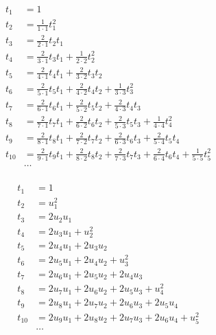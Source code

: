 \begin{equation*}
\begin{aligned}
t_1 &= 1 \\
t_2 &= \frac{1}{1 \cdot 1} t_1^2 \\
t_3 &= \frac{2}{2 \cdot 1} t_2 t_1 \\
t_4 &= 
  \frac{2}{3 \cdot 1} t_3 t_1 
+ \frac{1}{2 \cdot 2} t_2^2 
\\
t_5 &= 
  \frac{2}{4 \cdot 1} t_4 t_1 
+ \frac{2}{3 \cdot 2} t_3 t_2
\\
t_6 &= 
  \frac{2}{5 \cdot 1} t_5 t_1 
+ \frac{2}{4 \cdot 2} t_4 t_2
+ \frac{1}{3 \cdot 3} t_3^2
\\
t_7 &= 
  \frac{2}{6 \cdot 1} t_6 t_1 
+ \frac{2}{5 \cdot 2} t_5 t_2
+ \frac{2}{4 \cdot 3} t_4 t_3
\\
t_8 &= 
  \frac{2}{7 \cdot 1} t_7 t_1 
+ \frac{2}{6 \cdot 2} t_6 t_2
+ \frac{2}{5 \cdot 3} t_5 t_3
+ \frac{1}{4 \cdot 4} t_4^2
\\
t_9 &= 
  \frac{2}{8 \cdot 1} t_8 t_1 
+ \frac{2}{7 \cdot 2} t_7 t_2
+ \frac{2}{6 \cdot 3} t_6 t_3
+ \frac{2}{5 \cdot 4} t_5 t_4
\\
t_{10} &= 
  \frac{2}{9 \cdot 1} t_9 t_1 
+ \frac{2}{8 \cdot 2} t_8 t_2
+ \frac{2}{7 \cdot 3} t_7 t_3
+ \frac{2}{6 \cdot 4} t_6 t_4
+ \frac{1}{5 \cdot 5} t_5^2
\\
&\ldots \\
\end{aligned}
\end{equation*}

\begin{equation*}
\begin{aligned}
t_1 &= 1 \\
t_2 &= u_1^2 \\
t_3 &= 2 u_2 u_1 \\
t_4 &= 2 u_3 u_1 + u_2^2 \\
t_5 &= 2 u_4 u_1 + 2 u_3 u_2 \\
t_6 &= 2 u_5 u_1 + 2 u_4 u_2 + u_3^2 \\
t_7 &= 2 u_6 u_1 + 2 u_5 u_2 + 2 u_4 u_3 \\
t_8 &= 2 u_7 u_1 + 2 u_6 u_2 + 2 u_5 u_3 + u_4^2 \\
t_9 &= 2 u_8 u_1 + 2 u_7 u_2 + 2 u_6 u_3 + 2 u_5 u_4 \\
t_{10} &= 2 u_9 u_1 + 2 u_8 u_2 + 2 u_7 u_3 + 2 u_6 u_4 + u_5^2 \\
&\ldots \\
\end{aligned}
\end{equation*}

